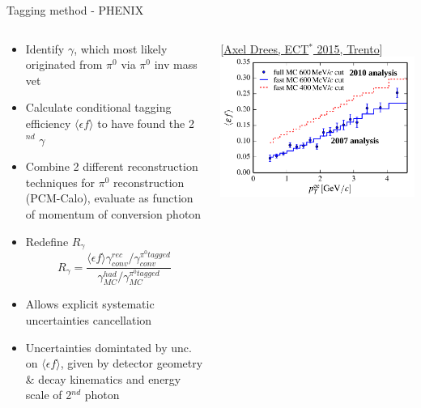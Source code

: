 \documentclass[aspectratio=169,10pt]{beamer}
\begin{document}
    \begin{frame}{Tagging method - PHENIX}
    \begin{columns}
      \begin{column}{9cm}
        \begin{itemize}
        \item Identify $\gamma$, which most likely originated from $\pi^0$ via $\pi^0$ inv mass vet 
        \item Calculate conditional tagging efficiency $\langle \epsilon f \rangle$ to have found the 2$^{nd}$ $\gamma$
        \item Combine 2 different reconstruction techniques for $\pi^0$ reconstruction (PCM-Calo), evaluate as function of momentum of conversion photon
        \item Redefine $R_{\gamma}$
              \begin{equation*}
                R_{\gamma} = \frac{\langle \epsilon f \rangle \gamma_{conv}^{rec}/\gamma_{conv}^{\pi^0 tagged}}{\gamma_{MC}^{had}/\gamma_{MC}^{\pi^0 tagged}}
              \end{equation*}
          \item Allows explicit systematic uncertainties cancellation
          \item Uncertainties domintated by unc. on $\langle \epsilon f \rangle$, given by detector geometry \& decay kinematics and energy scale of 2$^{nd}$ photon
        \end{itemize}
      \end{column}
      \begin{column}{7cm}
        \tiny \hspace{4.1cm} [\href{http://www.ectstar.eu/sites/www.ectstar.eu/files/talks/Drees_Trento.pdf}{Axel Drees, ECT$^*$ 2015, Trento}]\\
        \includegraphics[width=\textwidth]{EMLectureWeek2018/PHENIXTaggEff.pdf}
      \end{column}
    \end{columns}
  \end{frame}
\end{document}
